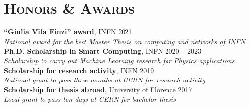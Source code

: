 \newcommand{\scholarship}[4]
  {\normalsize \textbf{\color{maincolor} #1},
  {\color{hlcolor-1} #2} \hfill {\color{hlcolor-2} #3}\\
  {\color{iconcolor} \faMedal} \emph{\color{maincolor} #4}}


\section*{\textsc{Honors \& Awards}}
\begin{cvcontent}
  \scholarship{``Giulia Vita Finzi'' award}{INFN}{2021}{National award for the best Master Thesis on computing and networks of INFN}
  \\ [3mm]
  \scholarship{Ph.D. Scholarship in Smart Computing}{INFN}{2020 -- 2023}{Scholarship to carry out Machine Learning research for Physics applications}
  \\ [3mm]
  \scholarship{Scholarship for research activity}{INFN}{2019}{National grant to pass three months at CERN for research activity}
  \\ [3mm]
  \scholarship{Scholarship for thesis abroad}{University of Florence}{2017}{Local grant to pass ten days at CERN for bachelor thesis}
\end{cvcontent}
